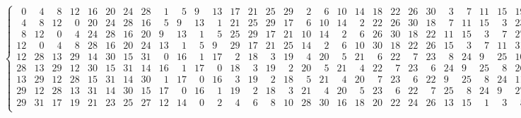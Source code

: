 \documentclass[fleqn, a4paper,12pt]{article}
\begin{document}
\small
\[
\begin{Bmatrix}
\phantom{0}0 & \phantom{0}4 & \phantom{0}8 & 12 & 16 & 20 & 24 & 28 & \phantom{0}1 & \phantom{0}5 & 9 & 13 & 17 & 21 & 25 & 29 & \phantom{0}2 & \phantom{0}6 & 10 & 14 & 18 & 22 & 26 & 30 & \phantom{0}3 & \phantom{0}7 & 11 & 15 & 19 & 23 & 27 & 31 \\
\phantom{0}4 & \phantom{0}8 & 12 & \phantom{0}0 & 20 & 24 & 28 & 16 & \phantom{0}5 & 9 & 13 & \phantom{0}1 & 21 & 25 & 29 & 17 & \phantom{0}6 & 10 & 14 & \phantom{0}2 & 22 & 26 & 30 & 18 & \phantom{0}7 & 11 & 15 & \phantom{0}3 & 23 & 27 & 31 & 19 \\
\phantom{0}8 & 12 & \phantom{0}0 & \phantom{0}4 & 24 & 28 & 16 & 20 & 9 & 13 & \phantom{0}1 & \phantom{0}5 & 25 & 29 & 17 & 21 & 10 & 14 & \phantom{0}2 & \phantom{0}6 & 26 & 30 & 18 & 22 & 11 & 15 & \phantom{0}3 & \phantom{0}7 & 27 & 31 & 19 & 23 \\
12 & \phantom{0}0 & \phantom{0}4 & \phantom{0}8 & 28 & 16 & 20 & 24 & 13 & \phantom{0}1 & \phantom{0}5 & 9 & 29 & 17 & 21 & 25 & 14 & \phantom{0}2 & \phantom{0}6 & 10 & 30 & 18 & 22 & 26 & 15 & \phantom{0}3 & \phantom{0}7 & 11 & 31 & 19 & 23 & 27 \\
12 & 28 & 13 & 29 & 14 & 30 & 15 & 31 & \phantom{0}0 & 16 & \phantom{0}1 & 17 & \phantom{0}2 & 18 & \phantom{0}3 & 19 & \phantom{0}4 & 20 & \phantom{0}5 & 21 & \phantom{0}6 & 22 & \phantom{0}7 & 23 & \phantom{0}8 & 24 & 9 & 25 & 10 & 26 & 11 & 27 \\
28 & 13 & 29 & 12 & 30 & 15 & 31 & 14 & 16 & \phantom{0}1 & 17 & \phantom{0}0 & 18 & \phantom{0}3 & 19 & \phantom{0}2 & 20 & \phantom{0}5 & 21 & \phantom{0}4 & 22 & \phantom{0}7 & 23 & \phantom{0}6 & 24 & 9 & 25 & \phantom{0}8 & 26 & 11 & 27 & 10 \\
13 & 29 & 12 & 28 & 15 & 31 & 14 & 30 & \phantom{0}1 & 17 & \phantom{0}0 & 16 & \phantom{0}3 & 19 & \phantom{0}2 & 18 & \phantom{0}5 & 21 & \phantom{0}4 & 20 & \phantom{0}7 & 23 & \phantom{0}6 & 22 & 9 & 25 & \phantom{0}8 & 24 & 11 & 27 & 10 & 26 \\
29 & 12 & 28 & 13 & 31 & 14 & 30 & 15 & 17 & \phantom{0}0 & 16 & \phantom{0}1 & 19 & \phantom{0}2 & 18 & \phantom{0}3 & 21 & \phantom{0}4 & 20 & \phantom{0}5 & 23 & \phantom{0}6 & 22 & \phantom{0}7 & 25 & \phantom{0}8 & 24 & 9 & 27 & 10 & 26 & 11 \\
29 & 31 & 17 & 19 & 21 & 23 & 25 & 27 & 12 & 14 & \phantom{0}0 & \phantom{0}2 & \phantom{0}4 & \phantom{0}6 & \phantom{0}8 & 10 & 28 & 30 & 16 & 18 & 20 & 22 & 24 & 26 & 13 & 15 & \phantom{0}1 & \phantom{0}3 & \phantom{0}5 & \phantom{0}7 & 9 & 11 \\

\end{Bmatrix}\]
\end{document}
